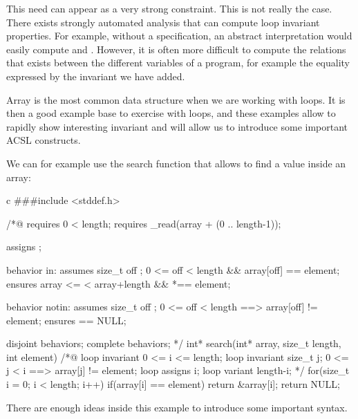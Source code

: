 \documentclass[middle]{zmdocument}
\begin{document}
\begin{Information}
  This need can appear as a very strong constraint. This is not really the
  case. There exists strongly automated analysis that can compute loop
  invariant properties. For example, without a specification, an abstract
  interpretation would easily compute 
  and .
  However, it is often more difficult to compute the relations
  that exists between the different variables of a program, for
  example the equality expressed by the invariant we have
  added.
\end{Information}






Array is the most common data structure when we are working with loops.
It is then a good example base to exercise with loops, and these
examples allow to rapidly show interesting invariant and will allow us
to introduce some important ACSL constructs.



We can for example use the search function that allows to find a value
inside an array:


\begin{CodeBlock}{c}
###include <stddef.h>

/*@
  requires 0 < length;
  requires \valid_read(array + (0 .. length-1));
  
  assigns  \nothing;

  behavior in:
    assumes \exists size_t off ; 0 <= off < length && array[off] == element;
    ensures array <= \result < array+length && *\result == element;

  behavior notin:
    assumes \forall size_t off ; 0 <= off < length ==> array[off] != element;
    ensures \result == NULL;

  disjoint behaviors;
  complete behaviors;
*/
int* search(int* array, size_t length, int element){
  /*@
    loop invariant 0 <= i <= length;
    loop invariant \forall size_t j; 0 <= j < i ==> array[j] != element;
    loop assigns i;
    loop variant length-i;
  */ 
  for(size_t i = 0; i < length; i++)
    if(array[i] == element) return &array[i];
  return NULL;
}
\end{CodeBlock}



There are enough ideas inside this example to introduce some important
syntax.
\end{document}
